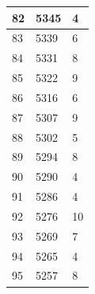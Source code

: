 \documentclass{article}
\begin{document}
\begin{center}
\begin{longtable}{|l|l|l|}
		\hline
		82                                                        & 5345                                                               & 4       \\ 
		\hline
		83                                                        & 5339                                                               & 6       \\ 
		\hline
		84                                                        & 5331                                                               & 8       \\ 
		\hline
		85                                                        & 5322                                                               & 9       \\ 
		\hline
		86                                                        & 5316                                                               & 6       \\ 
		\hline
		87                                                        & 5307                                                               & 9       \\ 
		\hline
		88                                                        & 5302                                                               & 5       \\ 
		\hline
		89                                                        & 5294                                                               & 8       \\ 
		\hline
		90                                                        & 5290                                                               & 4       \\ 
		\hline
		91                                                        & 5286                                                               & 4       \\ 
		\hline
		92                                                        & 5276                                                               & 10      \\ 
		\hline
		93                                                        & 5269                                                               & 7       \\ 
		\hline
		94                                                        & 5265                                                               & 4       \\ 
		\hline
		95                                                        & 5257                                                               & 8       \\ 

\end{longtable}
\end{center}
\end{document}
